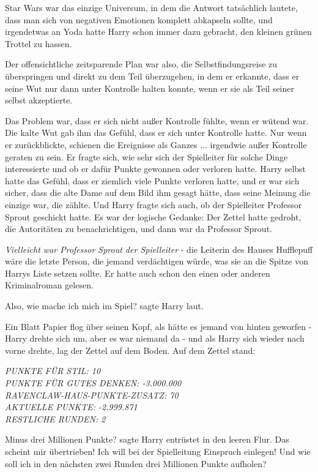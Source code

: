 Star Wars war das einzige Universum, in dem die Antwort tatsächlich lautete,
dass man sich von negativen Emotionen komplett abkapseln sollte, und irgendetwas
an Yoda hatte Harry schon immer dazu gebracht, den kleinen grünen Trottel zu
hassen.

Der offensichtliche zeitsparende Plan war also, die Selbstfindungsreise zu
überspringen und direkt zu dem Teil überzugehen, in dem er erkannte, dass er
seine Wut nur dann unter Kontrolle halten konnte, wenn er sie als Teil seiner
selbst akzeptierte.

Das Problem war, dass er sich nicht außer Kontrolle fühlte, wenn er wütend war.
Die kalte Wut gab ihm das Gefühl, dass er sich unter Kontrolle hatte. Nur wenn
er zurückblickte, schienen die Ereignisse als Ganzes ... irgendwie außer
Kontrolle geraten zu sein. Er fragte sich, wie sehr sich der Spielleiter für
solche Dinge interessierte und ob er dafür Punkte gewonnen oder verloren hatte.
Harry selbst hatte das Gefühl, dass er ziemlich viele Punkte verloren hatte, und
er war sich sicher, dass die alte Dame auf dem Bild ihm gesagt hätte, dass seine
Meinung die einzige war, die zählte. Und Harry fragte sich auch, ob der
Spielleiter Professor Sprout geschickt hatte. Es war der logische Gedanke: Der
Zettel hatte gedroht, die Autoritäten zu benachrichtigen, und dann war da
Professor Sprout.

\emph{Vielleicht war Professor Sprout der Spielleiter} - die Leiterin des Hauses
Hufflepuff wäre die letzte Person, die jemand verdächtigen würde, was sie an die
Spitze von Harrys Liste setzen sollte. Er hatte auch schon den einen oder
anderen Kriminalroman gelesen.

\glqq{}Also, wie mache ich mich im Spiel?\grqq{} sagte Harry laut.

Ein Blatt Papier flog über seinen Kopf, als hätte es jemand von hinten geworfen
- Harry drehte sich um, aber es war niemand da - und als Harry sich wieder nach
vorne drehte, lag der Zettel auf dem Boden. Auf dem Zettel stand:

\emph{PUNKTE FÜR STIL: 10} \\
\emph{PUNKTE FÜR GUTES DENKEN: -3.000.000} \\
\emph{RAVENCLAW-HAUS-PUNKTE-ZUSATZ: 70} \\
\emph{AKTUELLE PUNKTE: -2.999.871} \\
\emph{RESTLICHE RUNDEN: 2}

\glqq{}Minus drei Millionen Punkte?\grqq{} sagte Harry entrüstet in den leeren
Flur. \glqq{}Das scheint mir übertrieben! Ich will bei der Spielleitung Einspruch
einlegen! Und wie soll ich in den nächsten zwei Runden drei Millionen Punkte
aufholen?\grqq{}

